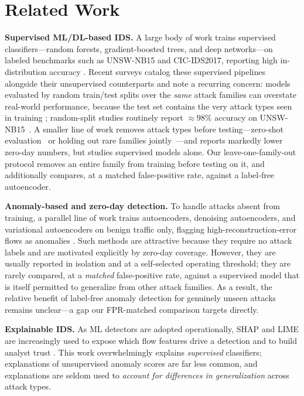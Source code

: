 \documentclass[conference]{IEEEtran}
\begin{document}
\section{Related Work}
\textbf{Supervised ML/DL-based IDS.} A large body of work trains supervised
classifiers---random forests, gradient-boosted trees, and deep networks---on labeled
benchmarks such as UNSW-NB15 and CIC-IDS2017, reporting high in-distribution accuracy
\cite{dl_ids}. Recent surveys catalog these supervised pipelines alongside their
unsupervised counterparts and note a recurring concern: models evaluated by random
train/test splits over the \emph{same} attack families can overstate real-world
performance, because the test set contains the very attack types seen in training
\cite{unsup_survey}; random-split studies routinely report $\approx 98\%$
accuracy on UNSW-NB15~\cite{kasongo_unsw}. A smaller line of work removes attack types
before testing---zero-shot evaluation~\cite{sarhan_zeroshot} or holding out rare
families jointly~\cite{lotfi_zeroday}---and reports markedly lower zero-day numbers, but
studies supervised models alone. Our leave-one-family-out protocol removes an entire
family from training before testing on it, and additionally compares, at a matched
false-positive rate, against a label-free autoencoder.

\textbf{Anomaly-based and zero-day detection.} To handle attacks absent from training,
a parallel line of work trains autoencoders, denoising autoencoders, and variational
autoencoders on benign traffic only, flagging high-reconstruction-error flows as
anomalies \cite{dae_zeroday,ae_review,sovae,zeroday_unseen}. Such methods are
attractive because they require no attack labels and are motivated explicitly by
zero-day coverage. However, they are usually reported in isolation and at a
self-selected operating threshold; they are rarely compared, at a \emph{matched}
false-positive rate, against a supervised model that is itself permitted to generalize
from other attack families. As a result, the relative benefit of label-free anomaly
detection for genuinely unseen attacks remains unclear---a gap our FPR-matched
comparison targets directly.

\textbf{Explainable IDS.} As ML detectors are adopted operationally, SHAP and LIME are
increasingly used to expose which flow features drive a detection and to build analyst
trust \cite{xai_survey,xai_eval,shap_fingerprint}. This work overwhelmingly explains
\emph{supervised} classifiers; explanations of unsupervised anomaly scores are far
less common, and explanations are seldom used to \emph{account for differences in
generalization} across attack types.
\end{document}
